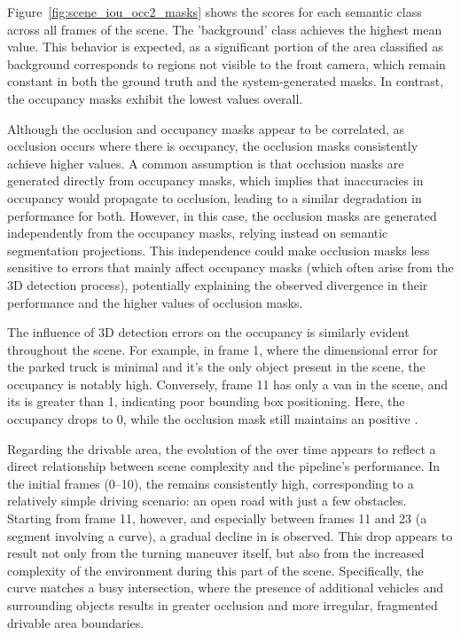Figure~\ref{fig:scene_iou_occ2_masks} shows the  scores for each semantic class across all frames of the scene. The 'background' class achieves the highest mean  value. This behavior is expected, as a significant portion of the area classified as background corresponds to regions not visible to the front camera, which remain constant in both the ground truth and the system-generated masks. In contrast, the occupancy masks exhibit the lowest  values overall.

Although the occlusion and occupancy masks appear to be correlated, as occlusion occurs where there is occupancy, the occlusion masks consistently achieve higher  values. A common assumption is that occlusion masks are generated directly from occupancy masks, which implies that inaccuracies in occupancy would propagate to occlusion, leading to a similar degradation in performance for both. However, in this case, the occlusion masks are generated independently from the occupancy masks, relying instead on semantic segmentation projections. This independence could make occlusion masks less sensitive to errors that mainly affect occupancy masks (which often arise from the 3D detection process), potentially explaining the observed divergence in their performance and the higher  values of occlusion masks.

The influence of 3D detection errors on the occupancy  is similarly evident throughout the scene. For example, in frame 1, where the dimensional error for the parked truck is minimal and it's the only object present in the scene, the occupancy  is notably high. Conversely, frame 11 has only a van in the scene, and its  is greater than 1, indicating poor bounding box positioning. Here, the occupancy  drops to 0, while the occlusion mask still maintains an positive .

Regarding the drivable area, the evolution of the  over time appears to reflect a direct relationship between scene complexity and the pipeline's performance. In the initial frames (0–10), the  remains consistently high, corresponding to a relatively simple driving scenario: an open road with just a few obstacles. Starting from frame 11, however, and especially between frames 11 and 23 (a segment involving a curve), a gradual decline in  is observed. This drop appears to result not only from the turning maneuver itself, but also from the increased complexity of the environment during this part of the scene. Specifically, the curve matches a busy intersection, where the presence of additional vehicles and surrounding objects results in greater occlusion and more irregular, fragmented drivable area boundaries.

